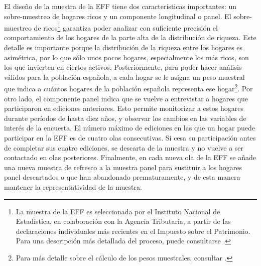El diseño de la muestra de la EFF tiene dos características importantes: un sobre-muestreo de hogares ricos y un componente longitudinal o panel. El sobre-muestreo de ricos\footnote{La muestra de la EFF es seleccionada por el Instituto Nacional de Estadística, en colaboración con la Agencia Tributaria, a partir de las declaraciones individuales más recientes en el Impuesto sobre el Patrimonio. Para una descripción más detallada del proceso, puede consultarse \cite{effmethod2017}.} garantiza poder analizar con suficiente precisión el comportamiento de los hogares de la parte alta de la distribución de riqueza. Este detalle es importante porque la distribución de la riqueza entre los hogares es asimétrica, por lo que sólo unos pocos hogares, especialmente los más ricos, son los que invierten en ciertos activos. Posteriormente, para poder hacer análisis válidos para la población española, a cada hogar se le asigna un peso muestral que indica a cuántos hogares de la población española representa ese hogar\footnote{Para más detalle sobre el cálculo de los pesos muestrales, consultar \cite{effmethod2002}.}. Por otro lado, el componente panel indica que se vuelve a entrevistar a hogares que participaron en ediciones anteriores. Esto permite monitorizar a estos hogares durante períodos de hasta diez años, y observar los cambios en las variables de interés de la encuesta. El número máximo de ediciones en las que un hogar puede participar en la EFF es de cuatro olas consecutivas. Si cesa su participación antes de completar sus cuatro ediciones, se descarta de la muestra y no vuelve a ser contactado en olas posteriores. Finalmente, en cada nueva ola de la EFF se añade una nueva muestra de refresco a la muestra panel para sustituir a los hogares panel descartados o que han abandonado prematuramente, y de esta manera mantener la representatividad de la muestra.